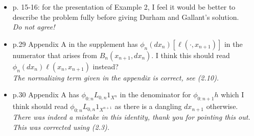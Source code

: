\documentclass[12pt]{amsart}
\begin{document}
\begin{itemize}
\item p. 15-16: for the presentation of Example 2, I feel it would be better to describe the problem fully before giving Durham and Gallant's solution.\\
{\em Do not agree!}
\item p.29 Appendix A in the supplement has $\phi_n(dx_n)[\ell(\cdot,x_{n+1})]$  in the numerator that arises from $B_n(x_{n+1},dx_n)$. I think this should read $\phi_n(dx_n)\ell(x_n,x_{n+1})$  instead?\\
{\em The normalizing term given in the appendix is correct, see (2.10).}
\item p.30 Appendix A has $\phi_{0:n}L_{0,n}1_{X^n}$  in the denominator for  $\phi_{0:n+1}h$ which I think should read  $\phi_{0:n}L_{0,n}1_{X^{n+1}}$ as there is a dangling $dx_{n+1}$ otherwise.\\
{\em There was indeed a mistake in this identity, thank you for pointing this out. This was corrected using (2.3).}
\end{itemize}
\end{document}
